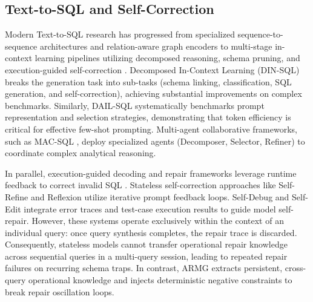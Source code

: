 \subsection{Text-to-SQL and Self-Correction}
Modern Text-to-SQL research has progressed from specialized sequence-to-sequence architectures and relation-aware graph encoders to multi-stage in-context learning pipelines utilizing decomposed reasoning, schema pruning, and execution-guided self-correction \cite{pourreza2023dinsql, gao2024dailsql, wang2025macsql, wang2018executionguided}. Decomposed In-Context Learning (DIN-SQL) \cite{pourreza2023dinsql} breaks the generation task into sub-tasks (schema linking, classification, SQL generation, and self-correction), achieving substantial improvements on complex benchmarks. Similarly, DAIL-SQL \cite{gao2024dailsql} systematically benchmarks prompt representation and selection strategies, demonstrating that token efficiency is critical for effective few-shot prompting. Multi-agent collaborative frameworks, such as MAC-SQL \cite{wang2025macsql}, deploy specialized agents (Decomposer, Selector, Refiner) to coordinate complex analytical reasoning.

In parallel, execution-guided decoding and repair frameworks leverage runtime feedback to correct invalid SQL \cite{madaan2023selfrefine, shinn2023reflexion, chen2024selfdebug, zhang2023selfedit, wang2018executionguided}. Stateless self-correction approaches like Self-Refine \cite{madaan2023selfrefine} and Reflexion \cite{shinn2023reflexion} utilize iterative prompt feedback loops. Self-Debug \cite{chen2024selfdebug} and Self-Edit \cite{zhang2023selfedit} integrate error traces and test-case execution results to guide model self-repair. However, these systems operate exclusively within the context of an individual query: once query synthesis completes, the repair trace is discarded. Consequently, stateless models cannot transfer operational repair knowledge across sequential queries in a multi-query session, leading to repeated repair failures on recurring schema traps. In contrast, ARMG extracts persistent, cross-query operational knowledge and injects deterministic negative constraints to break repair oscillation loops.

